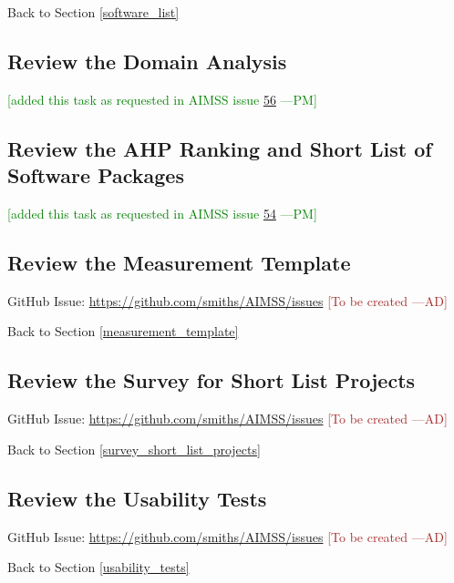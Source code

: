 \documentclass[12pt]{article}
\newcommand{\authornote}[3]{\textcolor{#1}{[#3 ---#2]}}
\newcommand{\authornote}[3]{}
\newcommand{\pmi}[1]{\authornote{green}{PM}{#1}} %
\newcommand{\ad}[1]{\authornote{brown}{AD}{#1}} %
\begin{document}
\noindent Back to Section \ref{software_list}

\subsection{Review the Domain Analysis}
\pmi{added this task as requested in AIMSS issue  \href{https://github.com/smiths/AIMSS/issues/56}{56}}


\subsection{Review the AHP Ranking and Short List of Software Packages}
\pmi{added this task as requested in AIMSS issue  \href{https://github.com/smiths/AIMSS/issues/54}{54}}


\subsection{Review the Measurement Template}
\label{task_measurement_template}
GitHub Issue:
\href{https://github.com/smiths/AIMSS/issues}{https://github.com/smiths/AIMSS/issues}
\ad{To be created}

\noindent Back to Section \ref{measurement_template}

\subsection{Review the Survey for Short List Projects}
\label{task_survey_short_list_projects}
GitHub Issue:
\href{https://github.com/smiths/AIMSS/issues}{https://github.com/smiths/AIMSS/issues}
\ad{To be created}

\noindent Back to Section \ref{survey_short_list_projects}

\subsection{Review the Usability Tests}
\label{task_usability_tests}
GitHub Issue:
\href{https://github.com/smiths/AIMSS/issues}{https://github.com/smiths/AIMSS/issues}
\ad{To be created}

\noindent Back to Section \ref{usability_tests}
\end{document}
